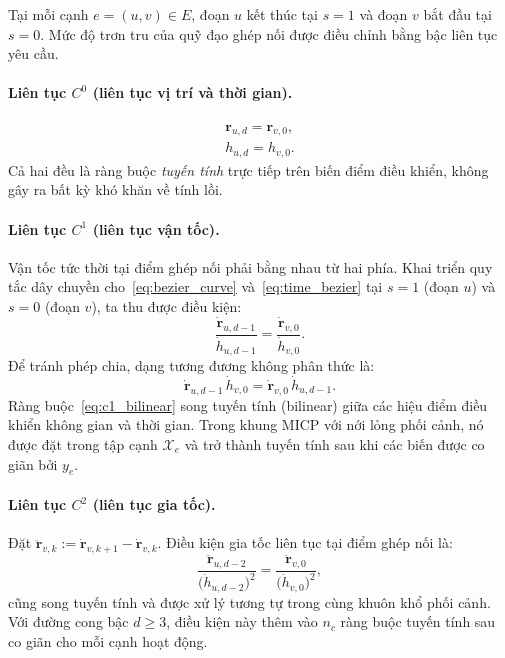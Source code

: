 Tại mỗi cạnh $e = (u,v) \in E$, đoạn $u$ kết thúc tại $s=1$ và đoạn $v$ bắt đầu
tại $s=0$. Mức độ trơn tru của quỹ đạo ghép nối được điều chỉnh bằng bậc liên
tục yêu cầu.

\paragraph{Liên tục $C^0$ (liên tục vị trí và thời gian).}
\begin{align}
    \mathbf{r}_{u,d} = \mathbf{r}_{v,0},
    \label{eq:c0_pos} \\
    h_{u,d} = h_{v,0}.
    \label{eq:c0_time}
\end{align}
Cả hai đều là ràng buộc \emph{tuyến tính} trực tiếp trên biến điểm điều khiển,
không gây ra bất kỳ khó khăn về tính lồi.

\paragraph{Liên tục $C^1$ (liên tục vận tốc).}
Vận tốc tức thời tại điểm ghép nối phải bằng nhau từ hai phía. Khai triển quy
tắc dây chuyền cho~\eqref{eq:bezier_curve} và~\eqref{eq:time_bezier} tại $s=1$
(đoạn $u$) và $s=0$ (đoạn $v$), ta thu được điều kiện:
\begin{equation}
    \frac{\dot{\mathbf{r}}_{u,d-1}}{\dot{h}_{u,d-1}}
    =
    \frac{\dot{\mathbf{r}}_{v,0}}{\dot{h}_{v,0}}.
    \label{eq:c1_vel}
\end{equation}
Để tránh phép chia, dạng tương đương không phân thức là:
\begin{equation}
    \dot{\mathbf{r}}_{u,d-1}\, \dot{h}_{v,0}
    =
    \dot{\mathbf{r}}_{v,0}\, \dot{h}_{u,d-1}.
    \label{eq:c1_bilinear}
\end{equation}
Ràng buộc~\eqref{eq:c1_bilinear} song tuyến tính (bilinear) giữa các hiệu điểm
điều khiển không gian và thời gian.
Trong khung MICP với nới lỏng phối cảnh, nó được đặt trong tập cạnh
$\mathcal{X}_e$ và trở thành tuyến tính sau khi các biến được co giãn bởi $y_e$.

\paragraph{Liên tục $C^2$ (liên tục gia tốc).}
Đặt $\ddot{\mathbf{r}}_{v,k} := \dot{\mathbf{r}}_{v,k+1} - \dot{\mathbf{r}}_{v,k}$.
Điều kiện gia tốc liên tục tại điểm ghép nối là:
\begin{equation}
    \frac{\ddot{\mathbf{r}}_{u,d-2}}{\bigl(\dot{h}_{u,d-2}\bigr)^2}
    =
    \frac{\ddot{\mathbf{r}}_{v,0}}{\bigl(\dot{h}_{v,0}\bigr)^2},
    \label{eq:c2_acc}
\end{equation}
cũng song tuyến tính và được xử lý tương tự trong cùng khuôn khổ phối cảnh.
Với đường cong bậc $d \ge 3$, điều kiện này thêm vào $n_c$ ràng buộc tuyến tính
sau co giãn cho mỗi cạnh hoạt động.

